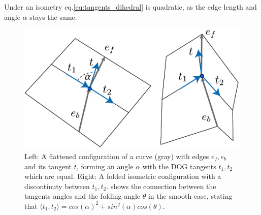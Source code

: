 Under an isometry eq.\eqref{eq:tangents_dihedral} is quadratic, as the edge length and angle $\alpha$ stays the same.

\begin{figure} [h]
	\centering
	\includegraphics[width=\linewidth]{figures/fold_angle_and_tangent_angles}
	\caption{Left: A flattened configuration of a curve (gray) with edges $e_f,e_b$ and its tangent $t$, forming an angle $\alpha$ with the DOG tangents $t_1,t_2$ which are equal. Right: A folded isometric configuration with a discontinuty between $t_1,t_2$.  shows the connection between the tangents angles and the folding angle $\theta$ in the smooth case, stating that $\langle t_1, t_2 \rangle = cos(\alpha)^2 + sin^2(\alpha) cos(\theta)$. }
	\label{fig:fold_angle_and_tangent_angles}
\end{figure}

